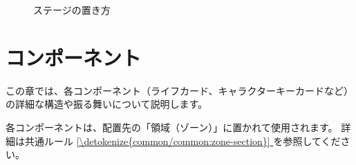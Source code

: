\documentclass[letterpaper,10pt,dvipdfmx]{sphinxmanual}
\begin{document}
\begin{figure}[htbp]
\centering
\capstart

\noindent{}
\caption{ステージの置き方}\label{\detokenize{common/common:id54}}\label{\detokenize{common/common:set-stage}}\end{figure}

\sphinxstepscope


\chapter{コンポーネント}
\label{\detokenize{component/component:component-rst}}\label{\detokenize{component/component:id1}}\label{\detokenize{component/component::doc}}
\sphinxAtStartPar
この章では、各コンポーネント（ライフカード、キャラクターキーカードなど）の詳細な構造や振る舞いについて説明します。

\sphinxAtStartPar
各コンポーネントは、配置先の「領域（ゾーン）」に置かれて使用されます。
詳細は共通ルール \hyperref[\detokenize{common/common:zone-section}]{\ref{\detokenize{common/common:zone-section}} } を参照してください。
\end{document}
